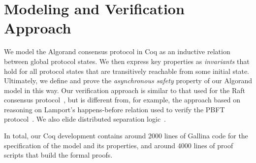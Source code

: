 \section{Modeling and Verification Approach}
\label{sec:approach}

We model the Algorand consensus protocol in Coq as an inductive relation between global protocol states. We then express key properties as \emph{invariants} that hold for all protocol states that are transitively reachable from some initial state. Ultimately, we define and prove the \emph{asynchronous safety} property of our Algorand model in this way. Our verification approach is similar to that used for the Raft consensus protocol~\cite{Woos2016}, but is different from, for example, the approach based on reasoning on Lamport's happens-before relation used to verify the PBFT protocol~\cite{Rahli2018}. We also elide distributed separation logic~\cite{Sergey2018}.

In total, our Coq development contains around 2000 lines of Gallina code for the specification of the model and its properties, and around 4000 lines of proof scripts that build the formal proofs.

